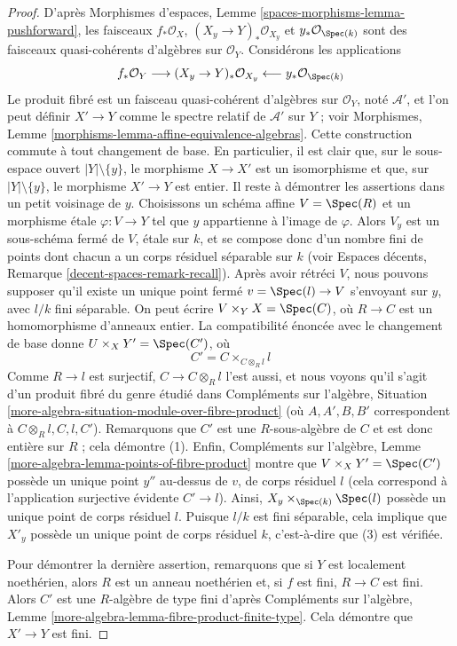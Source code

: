 \begin{proof}
D'après Morphismes d'espaces, Lemme \ref{spaces-morphisms-lemma-pushforward},
les faisceaux $f_*\mathcal{O}_X$, $(X_y \to Y)_*\mathcal{O}_{X_y}$ et
$y_*\mathcal{O}_{\Spec(k)}$ sont des faisceaux quasi-cohérents
d'algèbres sur $\mathcal{O}_Y$. Considérons les applications
$$
f_*\mathcal{O}_Y \longrightarrow
(X_y \to Y)_*\mathcal{O}_{X_y} \longleftarrow
y_*\mathcal{O}_{\Spec(k)}
$$
Le produit fibré est un faisceau quasi-cohérent d'algèbres sur $\mathcal{O}_Y$,
noté $\mathcal{A}'$, et l'on peut définir $X' \to Y$ comme le spectre relatif
de $\mathcal{A}'$ sur $Y$ ; voir
Morphismes, Lemme \ref{morphisms-lemma-affine-equivalence-algebras}.
Cette construction commute à tout changement de base.
En particulier, il est clair que, sur le sous-espace ouvert
$|Y| \setminus \{y\}$, le morphisme $X \to X'$ est un isomorphisme
et que, sur $|Y| \setminus \{y\}$, le morphisme $X' \to Y$ est entier.
Il reste à démontrer les assertions dans un petit voisinage de $y$.
Choisissons un schéma affine $V = \Spec(R)$ et un morphisme
étale $\varphi : V \to Y$ tel que $y$ appartienne à l'image de
$\varphi$. Alors $V_y$ est un sous-schéma fermé de $V$,
étale sur $k$, et se compose donc d'un nombre fini de points
dont chacun a un corps résiduel séparable sur $k$
(voir Espaces décents, Remarque \ref{decent-spaces-remark-recall}).
Après avoir rétréci $V$,
nous pouvons supposer qu'il existe un unique point fermé $v = \Spec(l) \to V$
s'envoyant sur $y$, avec $l/k$ fini séparable.
On peut écrire $V \times_Y X = \Spec(C)$, où $R \to C$
est un homomorphisme d'anneaux entier. La compatibilité énoncée avec le
changement de base donne $U \times_X Y' = \Spec(C')$, où
$$
C' = C \times_{C \otimes_R l} l
$$
Comme $R \to l$ est surjectif, $C \to C \otimes_R l$
l'est aussi, et nous voyons qu'il s'agit d'un produit fibré du
genre étudié dans Compléments sur l'algèbre, Situation
\ref{more-algebra-situation-module-over-fibre-product}
(où $A, A', B, B'$ correspondent à $C \otimes_R l, C, l, C'$).
Remarquons que $C'$ est une $R$-sous-algèbre de $C$ et est donc
entière sur $R$ ; cela démontre (1).
Enfin, Compléments sur l'algèbre, Lemme
\ref{more-algebra-lemma-points-of-fibre-product}
montre que $V \times_X Y' = \Spec(C')$
possède un unique point $y''$ au-dessus de $v$, de corps résiduel $l$
(cela correspond à l'application surjective évidente $C' \to l$).
Ainsi, $X_y \times_{\Spec(k)} \Spec(l)$ possède un unique point
de corps résiduel $l$. Puisque $l/k$ est fini séparable,
cela implique que $X'_y$ possède un unique point de corps résiduel $k$, c'est-à-dire
que (3) est vérifiée.

\medskip\noindent
Pour démontrer la dernière assertion, remarquons que si $Y$ est localement noethérien,
alors $R$ est un anneau noethérien et, si $f$ est fini, $R \to C$ est
fini. Alors $C'$ est une $R$-algèbre de type fini d'après Compléments sur l'algèbre,
Lemme \ref{more-algebra-lemma-fibre-product-finite-type}.
Cela démontre que $X' \to Y$ est fini.
\end{proof}

